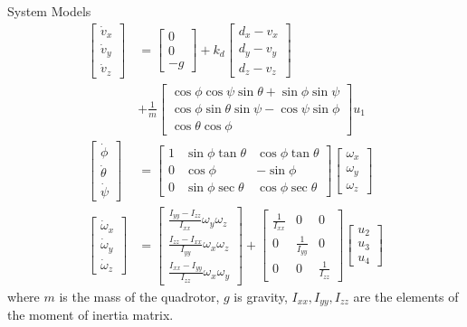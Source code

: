 \begin{section}{System Models}
\begin{equation*}
\begin{aligned}
	\begin{bmatrix}\dot{v}_x \\ \dot{v}_y \\ \dot{v}_z\end{bmatrix} &= \begin{bmatrix}0 \\ 0 \\ -g \end{bmatrix} + k_d \begin{bmatrix}d_x-v_x \\ d_y-v_y \\ d_z-v_z \end{bmatrix} \\ & + \frac{1}{m} \begin{bmatrix}\cos\phi \cos\psi \sin\theta + \sin\phi \sin\psi \\ \cos\phi \sin\theta \sin\psi - \cos\psi \sin\phi \\ \cos\theta \cos\phi \end{bmatrix} u_1 \\
	\begin{bmatrix}\dot{\phi} \\ \dot{\theta} \\ \dot{\psi}\end{bmatrix} &= \begin{bmatrix}1 & \sin\phi \tan\theta & \cos\phi \tan\theta\\ 0 & \cos\phi & -\sin\phi \\ 0 & \sin\phi \sec\theta & \cos\phi \sec\theta \end{bmatrix} \begin{bmatrix}\omega_{x} \\ \omega_{y} \\ \omega_{z} \end{bmatrix}\\
	\begin{bmatrix}\dot{\omega}_{x} \\ \dot{\omega}_{y} \\ \dot{\omega}_{z}\end{bmatrix} &= \begin{bmatrix}\frac{I_{yy} - I_{zz}}{I_{xx}} \omega_{y}\omega_{z}\\ \frac{I_{zz} - I_{xx}}{I_{yy}} \omega_{x}\omega_{z} \\ \frac{I_{xx} - I_{yy}}{I_{zz}} \omega_{x}\omega_{y} \end{bmatrix} +  \begin{bmatrix}\frac{1}{I_{xx}} & 0 & 0\\ 0 & \frac{1}{I_{yy}} & 0\\ 0 & 0 & \frac{1}{I_{zz}}\end{bmatrix} \begin{bmatrix}u_{2} \\ u_{3} \\ u_{4} \end{bmatrix}
	\end{aligned}
\end{equation*}
where $ m $ is the mass of the quadrotor, $ g $ is gravity, $ I_{xx}, I_{yy}, I_{zz} $ are the elements of the moment of inertia matrix.


\end{section}
